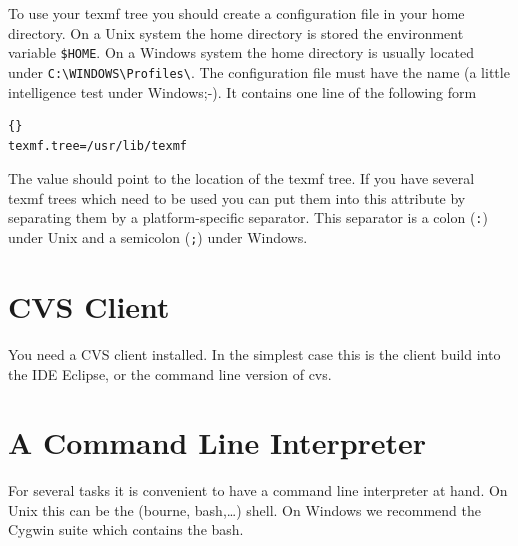 To use your texmf tree you should create a configuration file in your
home directory. On a Unix system the home directory is stored the
environment variable \verb|$HOME|. On a Windows system the home
directory is usually located under \verb|C:\WINDOWS\Profiles\|.  The
configuration file must have the name  (a little
intelligence test under Windows;-). It contains one line of the
following form

\begin{lstlisting}{}
texmf.tree=/usr/lib/texmf
\end{lstlisting}

The value should point to the location of the texmf tree. If you have
several texmf trees which need to be used you can put them into this
attribute by separating them by a platform-specific separator. This
separator is a colon (\verb|:|) under Unix and a semicolon (\verb|;|)
under Windows.


\section{CVS Client}

You need a CVS client installed. In the simplest case this is the
client build into the IDE Eclipse, or the command line version of cvs.


\section{A Command Line Interpreter}

For several tasks it is convenient to have a command line interpreter
at hand. On Unix this can be the (bourne, bash,\ldots) shell. On Windows
we recommend the Cygwin suite which contains the bash.


